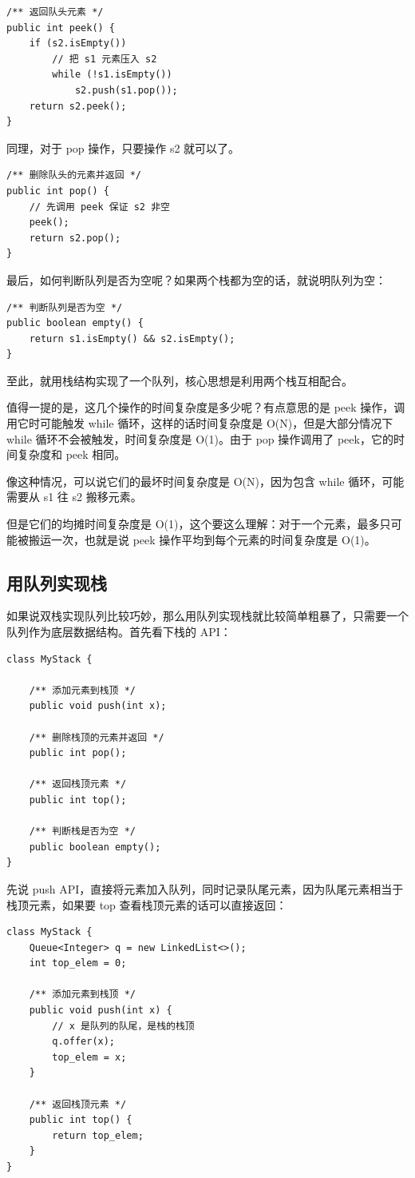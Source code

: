 \documentclass[12pt]{article}
\begin{document}
\begin{lstlisting}
/** 返回队头元素 */
public int peek() {
    if (s2.isEmpty())
        // 把 s1 元素压入 s2
        while (!s1.isEmpty())
            s2.push(s1.pop());
    return s2.peek();
}
\end{lstlisting}

同理，对于 pop 操作，只要操作 s2 就可以了。
\begin{lstlisting}
/** 删除队头的元素并返回 */
public int pop() {
    // 先调用 peek 保证 s2 非空
    peek();
    return s2.pop();
}
\end{lstlisting}

最后，如何判断队列是否为空呢？如果两个栈都为空的话，就说明队列为空：
\begin{lstlisting}
/** 判断队列是否为空 */
public boolean empty() {
    return s1.isEmpty() && s2.isEmpty();
}
\end{lstlisting}

至此，就用栈结构实现了一个队列，核心思想是利用两个栈互相配合。

值得一提的是，这几个操作的时间复杂度是多少呢？有点意思的是 peek 操作，调用它时可能触发 while 循环，这样的话时间复杂度是 O(N)，但是大部分情况下 while 循环不会被触发，时间复杂度是 O(1)。由于 pop 操作调用了 peek，它的时间复杂度和 peek 相同。

像这种情况，可以说它们的最坏时间复杂度是 O(N)，因为包含 while 循环，可能需要从 s1 往 s2 搬移元素。

但是它们的均摊时间复杂度是 O(1)，这个要这么理解：对于一个元素，最多只可能被搬运一次，也就是说 peek 操作平均到每个元素的时间复杂度是 O(1)。

\subsection{用队列实现栈}
如果说双栈实现队列比较巧妙，那么用队列实现栈就比较简单粗暴了，只需要一个队列作为底层数据结构。首先看下栈的 API：
\begin{lstlisting}
class MyStack {
    
    /** 添加元素到栈顶 */
    public void push(int x);
    
    /** 删除栈顶的元素并返回 */
    public int pop();
    
    /** 返回栈顶元素 */
    public int top();
    
    /** 判断栈是否为空 */
    public boolean empty();
}
\end{lstlisting}

先说 push API，直接将元素加入队列，同时记录队尾元素，因为队尾元素相当于栈顶元素，如果要 top 查看栈顶元素的话可以直接返回：
\begin{lstlisting}
class MyStack {
    Queue<Integer> q = new LinkedList<>();
    int top_elem = 0;

    /** 添加元素到栈顶 */
    public void push(int x) {
        // x 是队列的队尾，是栈的栈顶
        q.offer(x);
        top_elem = x;
    }
    
    /** 返回栈顶元素 */
    public int top() {
        return top_elem;
    }
}
\end{lstlisting}
\end{document}
